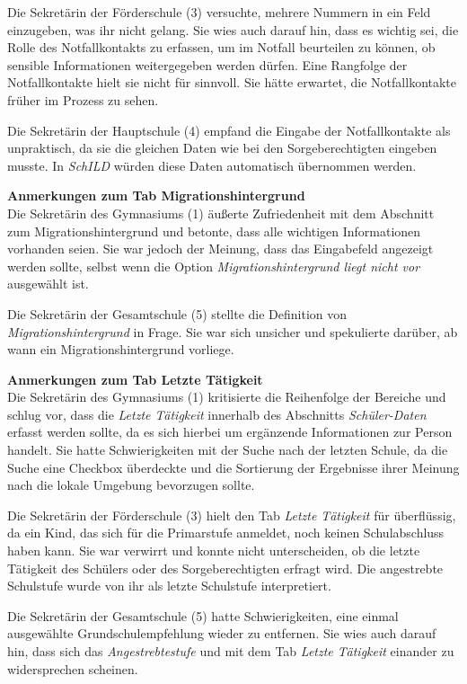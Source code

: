 Die Sekretärin der Förderschule (3) versuchte, mehrere Nummern in ein Feld einzugeben, was ihr nicht gelang. Sie wies auch darauf hin, dass es wichtig sei, die Rolle des Notfallkontakts zu erfassen, um im Notfall beurteilen zu können, ob sensible Informationen weitergegeben werden dürfen. Eine Rangfolge der Notfallkontakte hielt sie nicht für sinnvoll. Sie hätte erwartet, die Notfallkontakte früher im Prozess zu sehen.

Die Sekretärin der Hauptschule (4) empfand die Eingabe der Notfallkontakte als unpraktisch, da sie die gleichen Daten wie bei den Sorgeberechtigten eingeben musste. In \textit{SchILD} würden diese Daten automatisch übernommen werden.

\textbf{Anmerkungen zum Tab \glqq Migrationshintergrund\grqq{}}\\
Die Sekretärin des Gymnasiums (1) äußerte Zufriedenheit mit dem Abschnitt zum Migrationshintergrund und betonte, dass alle wichtigen Informationen vorhanden seien. Sie war jedoch der Meinung, dass das Eingabefeld angezeigt werden sollte, selbst wenn die Option \textit{Migrationshintergrund liegt nicht vor\grqq} ausgewählt ist.

Die Sekretärin der Gesamtschule (5) stellte die Definition von \textit{Migrationshintergrund} in Frage. Sie war sich unsicher und spekulierte darüber, ab wann ein Migrationshintergrund vorliege.

\textbf{Anmerkungen zum Tab \glqq Letzte Tätigkeit\grqq{}}\\
Die Sekretärin des Gymnasiums (1) kritisierte die Reihenfolge der Bereiche und schlug vor, dass die \textit{Letzte Tätigkeit} innerhalb des Abschnitts \textit{Schüler-Daten} erfasst werden sollte, da es sich hierbei um ergänzende Informationen zur Person handelt. Sie hatte Schwierigkeiten mit der Suche nach der letzten Schule, da die Suche eine Checkbox überdeckte und die Sortierung der Ergebnisse ihrer Meinung nach die lokale Umgebung bevorzugen sollte.

Die Sekretärin der Förderschule (3) hielt den Tab \textit{Letzte Tätigkeit} für überflüssig, da ein Kind, das sich für die Primarstufe anmeldet, noch keinen Schulabschluss haben kann. Sie war verwirrt und konnte nicht unterscheiden, ob die letzte Tätigkeit des Schülers oder des Sorgeberechtigten erfragt wird. Die angestrebte Schulstufe wurde von ihr als letzte Schulstufe interpretiert.

Die Sekretärin der Gesamtschule (5) hatte Schwierigkeiten, eine einmal ausgewählte Grundschulempfehlung wieder zu entfernen. Sie wies auch darauf hin, dass sich das \textit{Angestrebtestufe} und mit dem Tab \textit{Letzte Tätigkeit} einander zu widersprechen scheinen.

